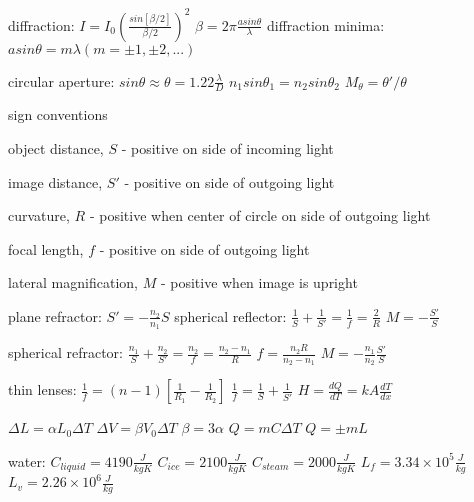 \documentclass{exam}
\begin{document}
diffraction: $I = I_0 \left(\frac{sin[\beta/2]}{\beta/2}  \right)^2$ \hspace{2mm} $\beta = 2\pi\frac{a sin\theta}{\lambda}$  diffraction minima: $a sin\theta=m\lambda (m=\pm1, \pm2, ...)$

circular aperture: $sin\theta \approx \theta=1.22\frac{\lambda}{D}$
$n_1 sin\theta_1=n_2 sin\theta_2$
$M_\theta=\theta'/\theta$

sign conventions

object distance, $S$ - positive on side of incoming light

image distance, $S'$ - positive on side of outgoing light

curvature, $R$ - positive when center of circle on side of outgoing light

focal length, $f$ - positive on side of outgoing light

lateral magnification, $M$ - positive when image is upright


plane refractor: $S'=-\frac{n_2}{n_1}S$
spherical reflector: $\frac{1}{S} + \frac{1}{S'}=\frac{1}{f}=\frac{2}{R}$
$M=-\frac{S'}{S}$

spherical refractor: $\frac{n_1}{S} + \frac{n_2}{S'}=\frac{n_2}{f}=\frac{n_2-n_1}{R}$
$f=\frac{n_2R}{n_2-n_1}$
$M=-\frac{n_1}{n_2}\frac{S'}{S}$

thin lenses: $\frac{1}{f}=(n-1)\left[\frac{1}{R_1}-\frac{1}{R_2}\right]$
$\frac{1}{f}=\frac{1}{S}+\frac{1}{S'}$
$H=\frac{dQ}{dT}=kA\frac{dT}{dx}$

$\Delta L = \alpha L_0 \Delta T$
$\Delta V = \beta V_0 \Delta T$
$\beta=3\alpha$
$Q=m C \Delta T$
$Q=\pm mL$


water: $C_{liquid}=4190\frac{J}{kgK}$
$C_{ice}=2100\frac{J}{kgK}$
$C_{steam}=2000\frac{J}{kgK}$
$L_f=3.34\times10^5 \frac{J}{kg}$
$L_v=2.26\times10^6 \frac{J}{kg}$
\end{document}
